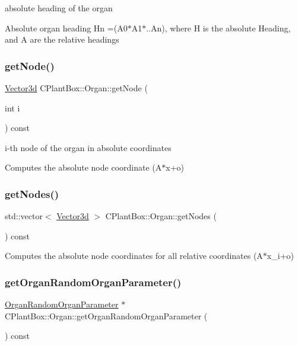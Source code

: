 absolute heading of the organ 

Absolute organ heading Hn =(A0$\ast$\+A1$\ast$..An), where H is the absolute Heading, and A are the relative headings \mbox{\label{classCPlantBox_1_1Organ_a17438f54d1d07af58867a4d257225e87}} 
\subsubsection{\texorpdfstring{get\+Node()}{getNode()}}
{\footnotesize\ttfamily \hyperlink{classCPlantBox_1_1Vector3d}{Vector3d} C\+Plant\+Box\+::\+Organ\+::get\+Node (\begin{DoxyParamCaption}\item[{int}]{i }\end{DoxyParamCaption}) const}



i-\/th node of the organ in absolute coordinates 

Computes the absolute node coordinate (A$\ast$x+o) \mbox{\label{classCPlantBox_1_1Organ_af990e5df473327cb2cdb6293d5117419}} 
\subsubsection{\texorpdfstring{get\+Nodes()}{getNodes()}}
{\footnotesize\ttfamily std\+::vector$<$ \hyperlink{classCPlantBox_1_1Vector3d}{Vector3d} $>$ C\+Plant\+Box\+::\+Organ\+::get\+Nodes (\begin{DoxyParamCaption}{ }\end{DoxyParamCaption}) const}

Computes the absolute node coordinates for all relative coordinates (A$\ast$x\+\_\+i+o) \mbox{\label{classCPlantBox_1_1Organ_aa6668fc995d856d1a06c92af06155f00}} 
\subsubsection{\texorpdfstring{get\+Organ\+Random\+Organ\+Parameter()}{getOrganRandomOrganParameter()}}
{\footnotesize\ttfamily \hyperlink{classCPlantBox_1_1OrganRandomOrganParameter}{Organ\+Random\+Organ\+Parameter} $\ast$ C\+Plant\+Box\+::\+Organ\+::get\+Organ\+Random\+Organ\+Parameter (\begin{DoxyParamCaption}{ }\end{DoxyParamCaption}) const}



